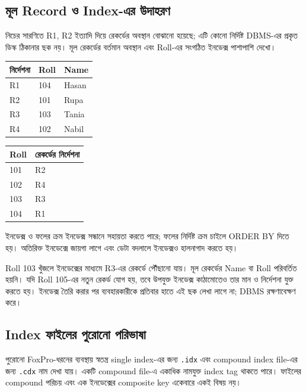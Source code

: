 \subsection{মূল Record ও Index-এর উদাহরণ}
নিচের সারণিতে R1, R2 ইত্যাদি দিয়ে রেকর্ডের অবস্থান বোঝানো হয়েছে; এটি কোনো নির্দিষ্ট DBMS-এর প্রকৃত ডিস্ক ঠিকানার ছক নয়। মূল রেকর্ডের বর্তমান অবস্থান এবং Roll-এর সংগঠিত ইনডেক্স পাশাপাশি দেখো।
\begin{flushleft}\small
\begin{tabular}{|l|l|l|}\hline
নির্দেশনা & Roll & Name\\\hline
R1 & 104 & Hasan\\\hline
R2 & 101 & Rupa\\\hline
R3 & 103 & Tania\\\hline
R4 & 102 & Nabil\\\hline
\end{tabular}\qquad
\begin{tabular}{|l|l|}\hline
Roll & রেকর্ডের নির্দেশনা\\\hline
101 & R2\\\hline102 & R4\\\hline103 & R3\\\hline104 & R1\\\hline
\end{tabular}
\end{flushleft}
\begin{flushleft}
\end{flushleft}
\begin{boardbox}{ইনডেক্স ও ফলের ক্রম}
ইনডেক্স সন্ধানে সহায়তা করতে পারে; ফলের নির্দিষ্ট ক্রম চাইলে ORDER BY দিতে হয়। অতিরিক্ত ইনডেক্সে জায়গা লাগে এবং ডেটা বদলালে ইনডেক্সও হালনাগাদ করতে হয়।
\end{boardbox}
Roll 103 খুঁজলে ইনডেক্সের মাধ্যমে R3-এর রেকর্ডে পৌঁছানো যায়। মূল রেকর্ডের Name বা Roll পরিবর্তিত হয়নি। যদি Roll 105-এর নতুন রেকর্ড যোগ হয়, তবে উপযুক্ত ইনডেক্স কাঠামোতেও তার মান ও নির্দেশনা যুক্ত করতে হয়। ইনডেক্স তৈরি করার পর ব্যবহারকারীকে প্রতিবার হাতে এই ছক লেখা লাগে না; DBMS রক্ষণাবেক্ষণ করে।

\subsection{Index ফাইলের পুরোনো পরিভাষা}
পুরোনো FoxPro-ধরনের ব্যবস্থায় স্বতন্ত্র single index-এর জন্য \texttt{.idx} এবং compound index file-এর জন্য \texttt{.cdx} নাম দেখা যায়। একটি compound file-এ একাধিক নামযুক্ত index tag থাকতে পারে। ফাইলের compound পরিচয় এবং এক ইনডেক্সের composite key একেবারে একই বিষয় নয়।

